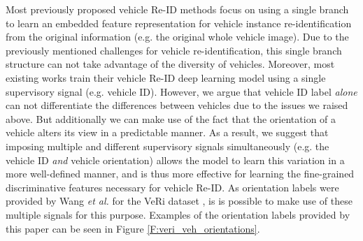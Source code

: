 \documentclass[10pt,twocolumn,letterpaper]{article}
\def\etal{\emph{et al.\hspace{0.3em}}}
\begin{document}
Most previously proposed vehicle Re-ID methods \cite{liu2016vehicleid,liu2016veri,Shen_2017_ICCV,Zhou2018VAMI} focus on using a single branch
to learn an embedded feature representation for vehicle instance re-identification
from the original information (e.g. the original whole vehicle image).
%
Due to the previously mentioned challenges for vehicle re-identification,
this single branch structure can not take advantage of the diversity of vehicles.
%
Moreover, most existing works
\cite{liu2016vehicleid,liu2016veri}
train their vehicle Re-ID deep learning model
using a single supervisory signal (e.g. vehicle ID).
%
However, we argue that vehicle ID label {\em alone} can not differentiate the differences between vehicles due to the issues we raised above. But additionally we can make use of the fact that the orientation of a vehicle alters its view in a predictable manner.
As a result, we suggest that imposing multiple and different supervisory signals
simultaneously (e.g. the vehicle ID \emph{and} vehicle orientation) allows the model to learn this variation in a more well-defined manner, and is thus more effective
for learning the fine-grained discriminative features necessary for vehicle
Re-ID. As orientation labels were provided by Wang \etal \cite{wang2017orientation} for the VeRi dataset \cite{liu2016veri}, is is possible to make use of these multiple signals for this purpose. Examples of the orientation labels provided by this paper can be seen in Figure \ref{F:veri_veh_orientations}.
\end{document}
